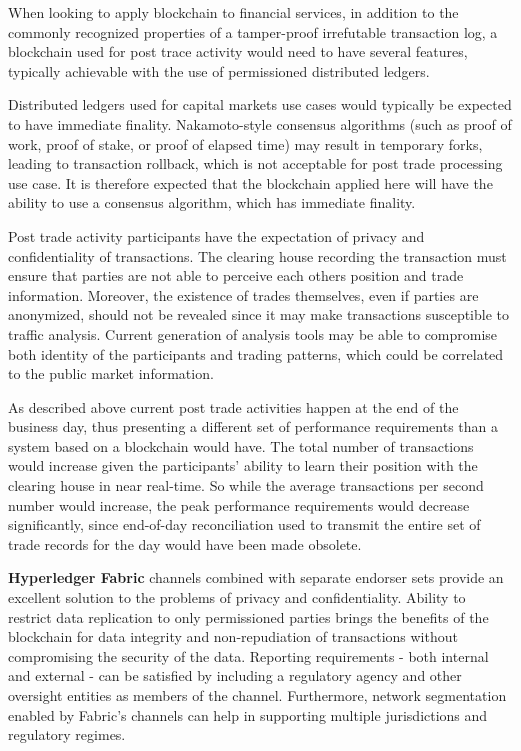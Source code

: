 When looking to apply blockchain to financial services, in addition to the commonly recognized properties of a tamper-proof irrefutable transaction log, a blockchain used for post trace activity would need to have several features, typically achievable with the use of permissioned distributed ledgers.

Distributed ledgers used for capital markets use cases would typically be expected to have immediate finality. Nakamoto-style consensus algorithms (such as proof of work, proof of stake, or proof of elapsed time) may result in temporary forks, leading to transaction rollback, which is not acceptable for post trade processing use case. It is therefore expected that the blockchain applied here will have the ability to use a consensus algorithm, which has immediate finality.

Post trade activity participants have the expectation of privacy and confidentiality of transactions. The clearing house recording the transaction must ensure that parties are not able to perceive each others position and trade information. Moreover, the existence of trades themselves, even if parties are anonymized, should not be revealed since it may make transactions susceptible to traffic analysis. Current generation of analysis tools may be able to compromise both identity of the participants and trading patterns, which could be correlated to the public market information.

As described above current post trade activities happen at the end of the business day, thus presenting a different set of performance requirements than a system based on a blockchain would have. The total number of transactions would increase given the participants' ability to learn their position with the clearing house in near real-time. So while the average transactions per second number would increase, the peak performance requirements would decrease significantly, since end-of-day reconciliation used to transmit the entire set of trade records for the day would have been made obsolete.

\textbf{Hyperledger Fabric} channels combined with separate endorser sets provide an excellent solution to the problems of privacy and confidentiality. Ability to restrict data replication to only permissioned parties brings the benefits of the blockchain for data integrity and non-repudiation of transactions without compromising the security of the data. Reporting requirements - both internal and external - can be satisfied by including a regulatory agency and other oversight entities as members of the channel. Furthermore, network segmentation enabled by Fabric's channels can help in supporting multiple jurisdictions and regulatory regimes.

